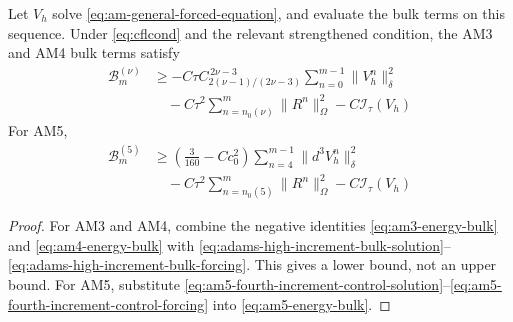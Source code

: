 \documentclass[11pt]{article}
\begin{document}
\begin{lem}
\label{lem:adams-bulk-lower-bounds}
Let \(V_h\) solve \eqref{eq:am-general-forced-equation}, and evaluate the
bulk terms on this sequence. Under \eqref{eq:cflcond} and the relevant
strengthened condition, the AM3 and AM4 bulk terms satisfy
\begin{align}
\mathcal B_m^{(\nu)}
&\ge-C\tau C_{2(\nu-1)/(2\nu-3)}^{\,2\nu-3}
\sum_{n=0}^{m-1}\|V_h^n\|_{\delta}^2 \label{eq:am34-bulk-lower-bound-solution}\\
&\quad-C\tau^2\sum_{n=n_0(\nu)}^{m}\|R^n\|_{\Omega}^2
-C\mathcal I_{\tau}(V_h) \label{eq:am34-bulk-lower-bound-forcing}
\end{align}
For AM5,
\begin{align}
\mathcal B_m^{(5)}
&\ge\left(\frac3{160}-Cc_0^2\right)
\sum_{n=4}^{m-1}\|d^3V_h^n\|_{\delta}^2 \label{eq:am5-bulk-lower-bound-solution}\\
&\quad-C\tau^2\sum_{n=n_0(5)}^{m}\|R^n\|_{\Omega}^2
-C\mathcal I_{\tau}(V_h) \label{eq:am5-bulk-lower-bound-forcing}
\end{align}
\end{lem}
\begin{proof}
For AM3 and AM4, combine the negative identities
\eqref{eq:am3-energy-bulk} and \eqref{eq:am4-energy-bulk} with
\eqref{eq:adams-high-increment-bulk-solution}--\eqref{eq:adams-high-increment-bulk-forcing}.
This gives a lower bound, not an upper bound. For AM5, substitute
\eqref{eq:am5-fourth-increment-control-solution}--\eqref{eq:am5-fourth-increment-control-forcing}
into \eqref{eq:am5-energy-bulk}.
\end{proof}
\end{document}
